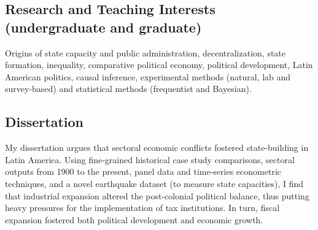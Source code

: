 \subsection*{Research and Teaching Interests (undergraduate and graduate)}

Origins of state capacity and public administration, decentralization, state formation, inequality, comparative political economy, political development, Latin American politics, causal inference, experimental methods (natural, lab and survey-based) and statistical methods (frequentist and Bayesian).

\subsection*{Dissertation}

	My dissertation argues that sectoral economic conflicts fostered state-building in Latin America. Using fine-grained historical case study comparisons, sectoral outputs from 1900 to the present, panel data and time-series econometric techniques, and a novel earthquake dataset (to measure state capacities), I find that industrial expansion altered the post-colonial political balance, thus putting heavy pressures for the implementation of tax institutions. In turn, fiscal expansion fostered both political development and economic growth.
